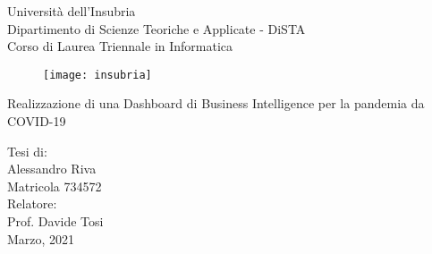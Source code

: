 \begin{titlepage}
  \begin{center}
  \begin{large}
  {\fontsize{20}{18}\selectfont\vspace*{0.50cm}Università dell'Insubria}\\
  \vspace{.1cm}
  Dipartimento di Scienze Teoriche e Applicate - DiSTA\\
  \vspace{.1cm}
  Corso di Laurea Triennale in Informatica
  \end{large}
  
  \vspace{1cm}
  \begin{figure}[h]
    \begin{center}
      \texttt{[image: insubria]}
    \end{center}
  \end{figure}

    {\fontsize{25}{25}\selectfont\par
    Realizzazione di una Dashboard di Business Intelligence per la pandemia da COVID-19}
    \par    
    \vspace{2.4cm}
    \begin{large}
    Tesi di:\\
    Alessandro Riva\\
    Matricola 734572\\
    \vspace{2.3cm}
    Relatore:\\
    Prof. Davide Tosi\\
    \vfill
    Marzo, 2021
    \end{large}
    

  \end{center}
\end{titlepage}